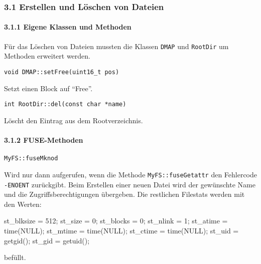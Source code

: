 \documentclass[]{article}
\newenvironment{Shaded}{}{}
\newcommand{\DecValTok}[1]{\textcolor[rgb]{0.25,0.63,0.44}{#1}}
\newcommand{\NormalTok}[1]{#1}
\let\oldparagraph\paragraph
\renewcommand{\paragraph}[1]{\oldparagraph{#1}\mbox{}}
\begin{document}
\hypertarget{erstellen-und-luxf6schen-von-dateien}{%
\subsubsection{3.1 Erstellen und Löschen von
Dateien}\label{erstellen-und-luxf6schen-von-dateien}}

\hypertarget{eigene-klassen-und-methoden-1}{%
\paragraph{3.1.1 Eigene Klassen und
Methoden}\label{eigene-klassen-und-methoden-1}}

Für das Löschen von Dateien mussten die Klassen \texttt{DMAP} und
\texttt{RootDir} um Methoden erweitert werden.

\texttt{void\ DMAP::setFree(uint16\_t\ pos)}

Setzt einen Block auf ``Free''.

\texttt{int\ RootDir::del(const\ char\ *name)}

Löscht den Eintrag aus dem Rootverzeichnis.


\hypertarget{fuse-methoden-1}{%
\paragraph{3.1.2 FUSE-Methoden}\label{fuse-methoden-1}}

\texttt{MyFS::fuseMknod}

Wird nur dann aufgerufen, wenn die Methode \texttt{MyFS::fuseGetattr} den
Fehlercode \texttt{-ENOENT} zurückgibt. Beim Erstellen einer neuen
Datei wird der gewünschte Name und die Zugriffsberechtigungen übergeben.
Die restlichen Filestats werden mit den Werten:

\begin{Shaded}
  \begin{framed}
\begin{Highlighting}[]
\NormalTok{st_blksize = }\DecValTok{512}\NormalTok{;}
\NormalTok{st_size = }\DecValTok{0}\NormalTok{;}
\NormalTok{st_blocks = }\DecValTok{0}\NormalTok{;}
\NormalTok{st_nlink = }\DecValTok{1}\NormalTok{;}
\NormalTok{st_atime = time(NULL);}
\NormalTok{st_mtime = time(NULL);}
\NormalTok{st_ctime = time(NULL);}
\NormalTok{st_uid = getgid();}
\NormalTok{st_gid = getuid();}
\end{Highlighting}
\end{framed}
\end{Shaded}

befüllt.
\end{document}
